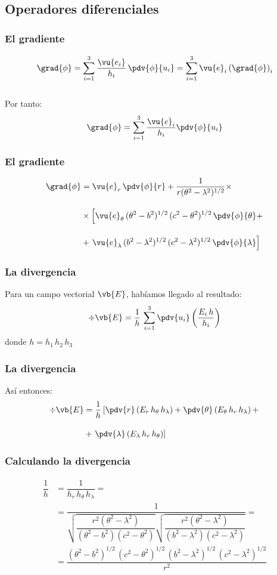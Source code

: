 \subsection{Operadores diferenciales}

\begin{frame}
\frametitle{El gradiente}
\begin{align*}
\grad{\phi} = \sum_{i=1}^{3} \dfrac{\vu{e_{i}}}{h_{i}} \, \pdv{\phi}{u_{i}} = \sum_{i=1}^{3} \vu{e}_{i} \left( \grad{\phi} \right)_{i}
\end{align*}
\\
\bigskip
\pause
Por tanto:
\begin{align*}
\grad{\phi} = \sum_{i=1}^{3} \dfrac{\vu{e}_{i}}{h_{i}} \pdv{\phi}{u_{i}}
\end{align*}
\end{frame}
\begin{frame}
\frametitle{El gradiente}
\begin{align*}
\grad{\phi} &= \vu{e}_{r} \, \pdv{\phi}{r} + \dfrac{1}{r (\theta^{2} - \lambda^{2})^{1/2}} \times \\[1em]
&\times \left[ \vu{e}_{\theta} \, (\theta^{2} - b^{2})^{1/2} \, (c^{2} - \theta^{2})^{1/2} \, \pdv{\phi}{\theta} + \right. \\[1em]
&+ \left. \vu{e}_{\lambda} \, (b^{2} - \lambda^{2})^{1/2} \, (c^{2} - \lambda^{2})^{1/2} \, \pdv{\phi}{\lambda} \right]
\end{align*}
\end{frame}
\begin{frame}
\frametitle{La divergencia}
Para un campo vectorial $\vb{E}$, habíamos llegado al resultado:
\begin{align*}
\div{\vb{E}} = \dfrac{1}{h} \, \sum_{i=1}^{3} \pdv{u_{i}} \left( \dfrac{E_{i} \, h}{h_{i}} \right)
\end{align*}
donde $h = h_{1} \, h_{2} \, h_{3}$
\end{frame}
\begin{frame}
\frametitle{La divergencia}
Así entonces:
\begin{align*}
\div{\vb{E}} &= \dfrac{1}{h} \left[ \pdv{r} \left( E_{r} \, h_{\theta} \, h_{\lambda} \right) + \pdv{\theta} \left( E_{\theta} \, h_{r} \, h_{\lambda} \right) + \right. \\[1em]
&+ \left. \pdv{\lambda} \left( E_{\lambda} \, h_{r} \, h_{\theta} \right) \right]
\end{align*}
\end{frame}
\begin{frame}
\frametitle{Calculando la divergencia}
\begin{align*}
\dfrac{1}{h} &= \dfrac{1}{ h_{r} \, h_{\theta} \, h_{\lambda}} = \\[1em]
&= \dfrac{1}{\sqrt{\dfrac{r^2 \left(\theta ^2-\lambda ^2\right)}{\left(\theta ^2-b^2\right) \left(c^2-\theta ^2\right)}} \sqrt{\dfrac{r^2 \left(\theta ^2-\lambda ^2\right)}{\left(b^2-\lambda ^2\right) \left(c^2-\lambda ^2\right)}}} = \\[1em]
&= \dfrac{(\theta^{2} {-} b^{2})^{1/2} \, (c^{2} {-} \theta^{2})^{1/2} \, (b^{2} {-} \lambda^{2})^{1/2} \, (c^{2} {-} \lambda^{2})^{1/2}}{r^{2}} 
\end{align*}
\end{frame}
